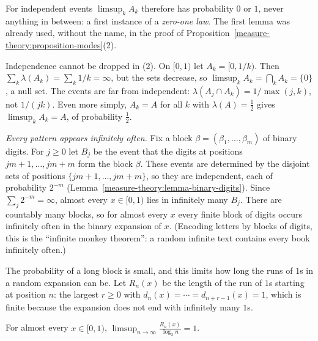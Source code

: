 For independent events $\limsup_kA_k$ therefore has probability $0$ or $1$, never anything in between: a first instance of a \emph{zero-one law}. The first lemma was already used, without the name, in the
proof of Proposition~\ref{measure-theory:proposition-modes}(2).

\begin{counterexample}\label{measure-theory:counterexample-borel-cantelli}
Independence cannot be dropped in (2). On $[0, 1)$ let $A_k = [0, 1/k)$. Then $\sum_k\lambda(A_k) = \sum_k1/k = \infty$, but the sets decrease, so
$\limsup_kA_k = \bigcap_kA_k = \{0\}$, a null set. The events are far from independent: $\lambda(A_j \cap A_k) = 1/\max(j, k)$, not $1/(jk)$. Even more simply, $A_k = A$ for all $k$ with $\lambda(A) = \frac12$ gives
$\limsup_kA_k = A$, of probability $\frac12$.
\end{counterexample}

\begin{example}\label{measure-theory:example-infinite-monkey}
\emph{Every pattern appears infinitely often.} Fix a block $\beta = (\beta_1, \ldots, \beta_m)$ of binary digits. For $j \geq 0$ let $B_j$ be the event that the digits at positions
$jm + 1, \ldots, jm + m$ form the block $\beta$. These events are determined by the disjoint sets of positions $\{jm + 1, \ldots, jm + m\}$, so they are independent, each of probability $2^{-m}$
(Lemma~\ref{measure-theory:lemma-binary-digits}). Since $\sum_j2^{-m} = \infty$, almost every $x \in [0, 1)$ lies in infinitely many $B_j$. There are countably many blocks, so for almost every $x$ every
finite block of digits occurs infinitely often in the binary expansion of $x$. (Encoding letters by blocks of digits, this is the ``infinite monkey theorem'': a random infinite text contains every
book infinitely often.)
\end{example}

The probability of a long block is small, and this limits how long the runs of $1$s in a random expansion can be. Let $R_n(x)$ be the length of the run of $1$s starting at position $n$: the largest $r \geq 0$ with
$d_n(x) = \cdots = d_{n+r-1}(x) = 1$, which is finite because the expansion does not end with infinitely many $1$s.

\begin{proposition}\label{measure-theory:proposition-long-runs}
For almost every $x \in [0, 1)$, $\displaystyle\limsup_{n \to \infty}\frac{R_n(x)}{\log_2n} = 1$.
\end{proposition}

